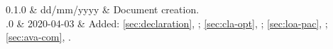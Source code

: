 \begin{chnglog}
	0.1.0 & dd/mm/yyyy & Document creation.\\
	.0 & 2020-04-03 &
		Added:
		\cref{sec:declaration}, ;
		\cref{sec:cla-opt}, ;
		\cref{sec:loa-pac}, ;
		\cref{sec:ava-com}, .\\
\end{chnglog}
